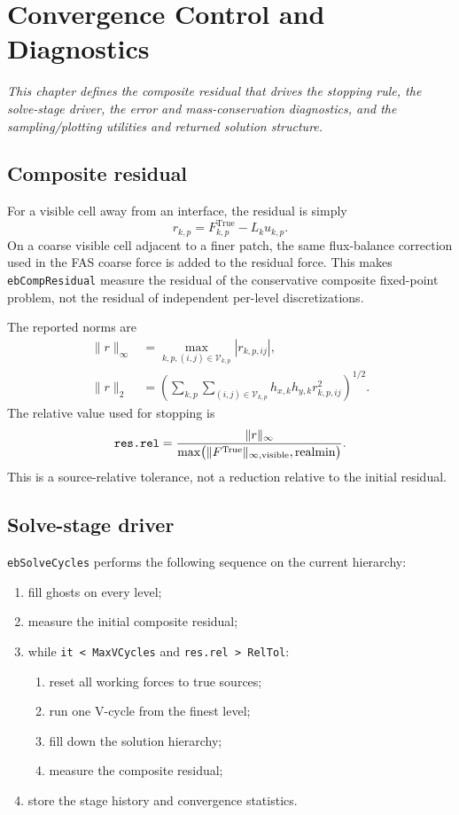 \documentclass[11pt,oneside,openany]{book}
\newcommand{\code}[1]{\textnormal{\texttt{#1}}}
\newcommand{\vis}{\mathcal{V}}
\begin{document}
\chapter{Convergence Control and Diagnostics}
\label{chap:diagnostics}

\emph{This chapter defines the composite residual that drives the stopping rule, the solve-stage driver, the error and mass-conservation diagnostics, and the sampling/plotting utilities and returned solution structure.}

\section{Composite residual}
For a visible cell away from an interface, the residual is simply
\[
  r_{k,p}=F^{\mathrm{True}}_{k,p}-L_ku_{k,p}.
\]
On a coarse visible cell adjacent to a finer patch, the same flux-balance correction used in the FAS coarse force is added to the residual force. This makes \code{ebCompResidual} measure the residual of the conservative composite fixed-point problem, not the residual of independent per-level discretizations.

The reported norms are
\begin{align}
 \|r\|_\infty&=\max_{k,p,(i,j)\in\vis_{k,p}}|r_{k,p,ij}|,\\
 \|r\|_2&=\left(
   \sum_{k,p}\sum_{(i,j)\in\vis_{k,p}}
   h_{x,k}h_{y,k}r_{k,p,ij}^2
 \right)^{1/2}.
 \label{eq:resnorms}
\end{align}
The relative value used for stopping is
\begin{equation}
  \code{res.rel}=\frac{\|r\|_\infty}
  {\max\bigl(\|F^{\mathrm{True}}\|_{\infty,\mathrm{visible}},\mathrm{realmin}\bigr)}.
  \label{eq:relres}
\end{equation}
This is a source-relative tolerance, not a reduction relative to the initial residual.

\section{Solve-stage driver}
\code{ebSolveCycles} performs the following sequence on the current hierarchy:
\begin{enumerate}[label=\arabic*.]
\item fill ghosts on every level;
\item measure the initial composite residual;
\item while \code{it < MaxVCycles} and \code{res.rel > RelTol}:
  \begin{enumerate}[label=(\alph*)]
  \item reset all working forces to true sources;
  \item run one V-cycle from the finest level;
  \item fill down the solution hierarchy;
  \item measure the composite residual;
  \end{enumerate}
\item store the stage history and convergence statistics.
\end{enumerate}
\end{document}
